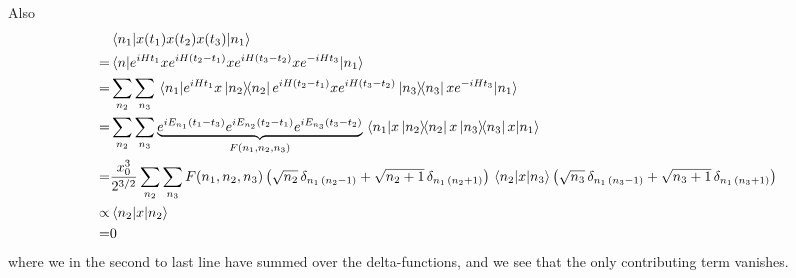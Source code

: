 \documentclass[a4paper,11pt]{article}
\begin{document}
Also
\begin{equation}
\begin{aligned}
&\mel{n_1}{x(t_1)x(t_2)x(t_3)}{n_1}\\
=&\mel{n}{e^{iHt_1}xe^{iH(t_2-t_1)}xe^{iH(t_3-t_2)}xe^{-iHt_3}}{n_1}\\
=&\sum_{n_2}\sum_{n_3}\mel{n_1}{e^{iHt_1}x\dyad{n_2}{n_2}e^{iH(t_2-t_1)}xe^{iH(t_3-t_2)}\dyad{n_3}{n_3}xe^{-iHt_3}}{n_1}
\\
=&\sum_{n_2}\sum_{n_3}\underbrace{e^{iE_{n_1}(t_1-t_3)}e^{iE_{n_2}(t_2-t_1)}e^{iE_{n_3}(t_3-t_2)}}_{F(n_1,n_2,n_3)}\mel{n_1}{x\dyad{n_2}{n_2}x\dyad{n_3}{n_3}x}{n_1}
\\
=&\frac{x_0^3}{2^{3/2}}\sum_{n_2}\sum_{n_3}F(n_1,n_2,n_3)\left(\sqrt{n_2}\,\delta_{n_1\,(n_2-1)}+\sqrt{n_2+1}\,\delta_{n_1\,(n_2+1)}\right)\mel{n_2}{x}{n_3}\left(\sqrt{n_3}\,\delta_{n_1\,(n_3-1)}+\sqrt{n_3+1}\,\delta_{n_1\,(n_3+1)}\right)\\
\propto&\mel{n_2}{x}{n_2}\\
=&0
\end{aligned}
\end{equation}
where we in the second to last line have summed over the delta-functions, and we see that the only contributing term vanishes.
\newpage
\end{document}

